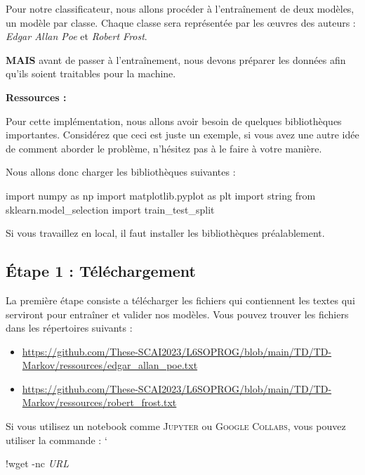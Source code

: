 \vspace{0.5cm}
Pour notre classificateur, nous allons procéder à l’entraînement de deux modèles, un modèle par classe. Chaque classe sera représentée par les œuvres des auteurs : \textit{Edgar Allan Poe} et \textit{Robert Frost}. 

\textbf{MAIS} avant de passer à l'entraînement, nous devons préparer les données afin qu'ils soient traitables pour la machine.

\textbf{Ressources : }

Pour cette implémentation, nous allons avoir besoin de quelques bibliothèques importantes. Considérez que ceci est juste un exemple, si vous avez une autre idée de comment aborder le problème, n’hésitez pas à le faire à votre manière.

Nous allons donc charger les bibliothèques suivantes :

\begin{python}
import numpy as np
import matplotlib.pyplot as plt
import string
from sklearn.model_selection import train_test_split
\end{python}

Si vous travaillez en local, il faut installer les bibliothèques préalablement.

\vspace{0.5cm}

\subsection{Étape 1 : Téléchargement}

La première étape consiste a télécharger les fichiers qui contiennent les textes qui serviront pour entraîner et valider nos modèles. Vous pouvez trouver les fichiers dans les répertoires suivants :

\begin{itemize}
\item \url{https://github.com/These-SCAI2023/L6SOPROG/blob/main/TD/TD-Markov/ressources/edgar_allan_poe.txt}
\item \url{https://github.com/These-SCAI2023/L6SOPROG/blob/main/TD/TD-Markov/ressources/robert_frost.txt}
\end{itemize}

Si vous utilisez un notebook comme \textsc{Jupyter} ou \textsc{Google Collabs}, vous pouvez utiliser la commande :
`
\begin{python}
!wget -nc \textit{URL}
\end{python}
 
